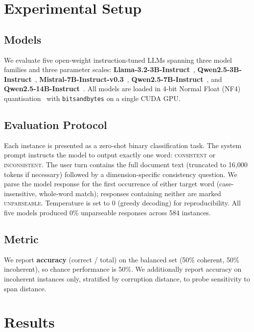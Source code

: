 \documentclass{llncs}
\begin{document}
\section{Experimental Setup}
\subsection{Models}
We evaluate five open-weight instruction-tuned LLMs spanning three model families
and three parameter scales:
\textbf{Llama-3.2-3B-Instruct}~\cite{meta2024llama3},
\textbf{Qwen2.5-3B-Instruct}~\cite{qwen2024},
\textbf{Mistral-7B-Instruct-v0.3}~\cite{jiang2023mistral},
\textbf{Qwen2.5-7B-Instruct}~\cite{qwen2024}, and
\textbf{Qwen2.5-14B-Instruct}~\cite{qwen2024}.
All models are loaded in 4-bit Normal Float (NF4) quantisation~\cite{dettmers2023qlora}
with \texttt{bitsandbytes} on a single CUDA GPU.

\subsection{Evaluation Protocol}
Each instance is presented as a zero-shot binary classification task.
The system prompt instructs the model to output exactly one word:
\textsc{consistent} or \textsc{inconsistent}.
The user turn contains the full document text (truncated to 16{,}000 tokens
if necessary) followed by a dimension-specific consistency question.
We parse the model response for the first occurrence of either target word
(case-insensitive, whole-word match);
responses containing neither are marked \textsc{unparseable}.
Temperature is set to 0 (greedy decoding) for reproducibility.
All five models produced 0\% unparseable responses across 584 instances.

\subsection{Metric}
We report \textbf{accuracy} (correct / total)
on the balanced set (50\% coherent, 50\% incoherent),
so chance performance is 50\%.
We additionally report accuracy on incoherent instances only,
stratified by corruption distance, to probe sensitivity to span distance.

\section{Results}
\end{document}
